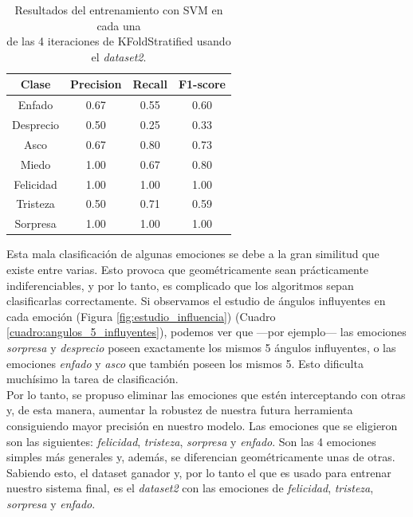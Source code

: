 \begin{table}[h!]
\begin{minipage}{0.48\linewidth}
\begin{adjustbox}{max width=\textwidth}
\begin{tabular}{|c|c|c|c|}
\hline
\textbf{Clase} & \textbf{Precision} & \textbf{Recall} & \textbf{F1-score}\\
\hline
     Enfado & 0.67 & 0.55 & 0.60\\
     Desprecio & 0.50 & 0.25 & 0.33\\
     Asco & 0.67 & 0.80 & 0.73\\
     Miedo & 1.00 & 0.67 & 0.80\\
     Felicidad & 1.00 & 1.00 & 1.00\\
     Tristeza & 0.50 & 0.71 & 0.59\\
     Sorpresa & 1.00 & 1.00 & 1.00\\
\hline
\end{tabular}
\end{adjustbox}
\end{minipage}
\captionsetup{justification=centering}
\caption{Resultados del entrenamiento con SVM en cada una\\
de las 4 iteraciones de KFoldStratified usando el \textit{dataset2}.}
\label{cuadro:resultados_SVM}
\end{table}

Esta mala clasificación de algunas emociones se debe a la gran similitud que existe entre varias. Esto provoca que geométricamente sean prácticamente indiferenciables, y por lo tanto, es complicado que los algoritmos sepan clasificarlas correctamente. Si observamos el estudio de ángulos influyentes en cada emoción (Figura \ref{fig:estudio_influencia}) (Cuadro \ref{cuadro:angulos_5_influyentes}), podemos ver que ---por ejemplo--- las emociones \textit{sorpresa} y \textit{desprecio} poseen exactamente los mismos 5 ángulos influyentes, o las emociones \textit{enfado} y \textit{asco} que también poseen los mismos 5. Esto dificulta muchísimo la tarea de clasificación.\\

Por lo tanto, se propuso eliminar las emociones que estén interceptando con otras y, de esta manera, aumentar la robustez de nuestra futura herramienta consiguiendo mayor precisión en nuestro modelo. Las emociones que se eligieron son las siguientes: \textit{felicidad}, \textit{tristeza}, \textit{sorpresa} y \textit{enfado}. Son las 4 emociones simples más generales y, además, se diferencian geométricamente unas de otras. Sabiendo esto, el dataset ganador y, por lo tanto el que es usado para entrenar nuestro sistema final, es el \textit{dataset2} con las emociones de \textit{felicidad}, \textit{tristeza}, \textit{sorpresa} y \textit{enfado}.

